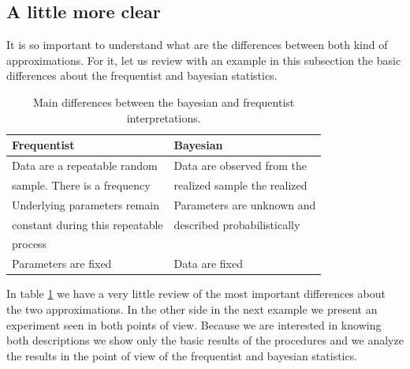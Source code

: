 \documentclass[onecolumn,           %
               showpacs,            %
               preprintnumbers,     %
               aps,                 %
               prl,          	    %
               letterpaper,             %
               superscriptaddress,      %
               nofootinbib,         %
               tightenlines,        %
               floats,floatfix      %
               ,usenatbib,
               ]{revtex4-1}
\begin{document}
\subsection{A little more clear}

It is so important to understand what are the differences between both kind of approximations. For it, let us review with an example in this subsection the basic differences about the frequentist and bayesian statistics.
\begin{table}[h!]
\centering
\begin{tabular}{||l|l||} 
 \hline
 \textbf{Frequentist} & \textbf{Bayesian} \\ [0.5ex] 
 \hline\hline
 Data are a repeatable random  & Data are observed from the   \\ 
 sample. There is a frequency & realized sample the realized \\
 \hline 
 Underlying parameters remain & Parameters are unknown and \\
 constant during this repeatable & described probabilistically \\
 process &  \\
\hline
Parameters are fixed & Data are fixed\\ [1ex] 
 \hline
\end{tabular}
\caption{\footnotesize{Main differences between the bayesian and frequentist interpretations.}}
\label{table:1}
\end{table}

In table \ref{table:1} we have a very little review of the most important differences about the two approximations. In the other side in the next example we present an experiment seen in both points of view. Because we are interested in knowing both descriptions we show only the basic results of the procedures and we analyze the results in the point of view of the frequentist and bayesian statistics. 
\end{document}
